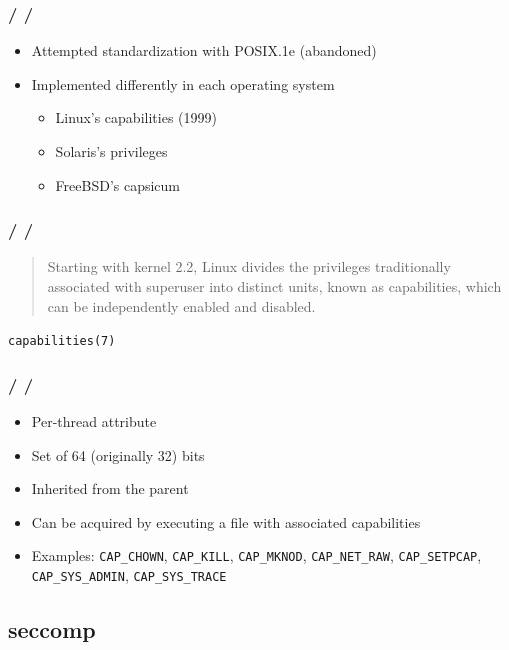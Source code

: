 \documentclass{beamer}
\newcommand{\autotitle}
{\frametitle{
    \secname
    \ifx\insertsubsection\empty
    \else
        /\subsecname
        \ifx\insertsubsubsection\empty\else/\subsubsecname\fi
    \fi}}
\begin{document}
\begin{frame}
    \autotitle
    \begin{itemize}
        \item Attempted standardization with POSIX.1e (abandoned)
        \item Implemented differently in each operating system
        \begin{itemize}
            \item Linux's capabilities (1999)
            \item Solaris's privileges
            \item FreeBSD's capsicum
        \end{itemize}
    \end{itemize}
\end{frame}

\begin{frame}
    \autotitle
    \begin{quote}
        Starting with kernel 2.2, Linux divides the privileges traditionally
        associated with superuser into distinct units, known as capabilities,
        which can be independently enabled and disabled.
    \end{quote}
    \texttt{capabilities(7)}
\end{frame}

\begin{frame}
    \autotitle
    \begin{itemize}
        \item Per-thread attribute
        \item Set of 64 (originally 32) bits
        \item Inherited from the parent
        \item Can be acquired by executing a file with associated capabilities
        \item
            Examples: \texttt{CAP\_CHOWN}, \texttt{CAP\_KILL},
            \texttt{CAP\_MKNOD}, \texttt{CAP\_NET\_RAW}, \texttt{CAP\_SETPCAP},
            \texttt{CAP\_SYS\_ADMIN}, \texttt{CAP\_SYS\_TRACE}
    \end{itemize}
\end{frame}

\subsection{seccomp}
\end{document}
